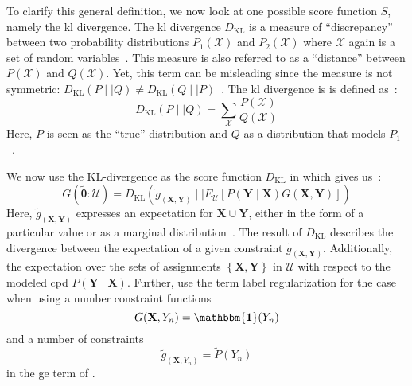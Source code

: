 \bigskip

To clarify this general definition, we now look at one possible score function $S$, namely the \acrfull{kl} divergence.
The \gls{kl} divergence $D_{\text{KL}}$ is a measure of ``discrepancy'' between two probability distributions $P_1(\mathcal{X})$ and $P_2(\mathcal{X})$ where $\mathcal{X}$ again is a set of \glspl{random variable}~\citep{burnham2003model}.
This measure is also referred to as a ``distance'' between $P(\mathcal{X})$ and $Q(\mathcal{X})$.
Yet, this term can be misleading since the measure is not symmetric: $D_{\text{KL}}(P\mid\mid Q)\neq D_{\text{KL}}(Q\mid\mid P)$~\citep{burnham2003model}.
The \gls{kl} divergence is is defined as~\citep{mackay2003information}:
\begin{equation}
  \label{equ:kl-divergence}
  D_{\text{KL}}(P\mid\mid Q)=\sum_\mathcal{X} \frac{P(\mathcal{X})}{Q(\mathcal{X})}
\end{equation}
Here, $P$ is seen as the ``true'' distribution and $Q$ as a distribution that models $P_1$~\citep{burnham2003model}.

\bigskip

We now use the $\text{KL}$-divergence as the score function $D_{\text{KL}}$ in  which gives us~\citep{mann2010generalized}:
\begin{equation}
  \label{equ:generalized-expectation-kl}
  G(\bm{\tilde{\theta}}:\mathcal{U})=D_{\text{KL}}\left(\tilde{g}_{\left(\mathbf{X},\mathbf{Y}\right)}\mid\mid E_{\mathcal{U}}\left[P(\mathbf{Y}\mid\mathbf{X})G(\mathbf{X},\mathbf{Y})\right]\right)
\end{equation}
Here, $\tilde{g}_{\left(\mathbf{X},\mathbf{Y}\right)}$ expresses an expectation for $\mathbf{X}\cup\mathbf{Y}$, either in the form of a particular value or as a \gls{marginal distribution}~\citep{mann2010generalized}.
The result of $D_{\text{KL}}$ describes the divergence between the expectation of a given constraint $\tilde{g}_{\left(\mathbf{X},\mathbf{Y}\right)}$.
Additionally, the expectation over the sets of assignments $\left\{\mathbf{X},\mathbf{Y}\right\}$ in $\mathcal{U}$ with respect to the modeled \gls{cpd} $P(\mathbf{Y}\mid\mathbf{X})$.
Further, \citet{mann2010generalized} use the term \gls{label regularization} for the case when using a number constraint functions
\begin{equation}
  \label{equ:label-regularization-constraint-function}
  G(\mathbf{X},Y_n)=\mathbf{\mathbbm{1}}(Y_n)
\end{equation}
and a number of constraints
\begin{equation}
  \label{equ:label-regularization-constraints}
  \tilde{g}_{\left(\mathbf{X},Y_n\right)}=\tilde{P}(Y_n)
\end{equation}
in the \gls{ge} term of .

